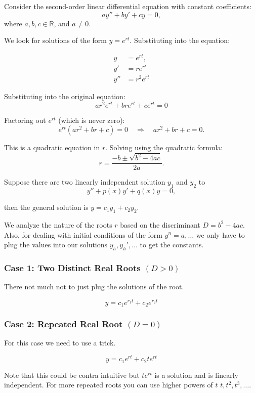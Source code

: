 Consider the second-order linear differential equation with constant coefficients:
\[
a y'' + b y' + c y = 0,
\]
where \( a, b, c \in \mathbb{R} \), and \( a \neq 0 \).

We look for solutions of the form \( y = e^{rt} \). Substituting into the equation:

\begin{align*}
y &= e^{rt}, \\
y' &= r e^{rt} \\
y'' &=  r^2 e^{rt}
\end{align*}


Substituting into the original equation:
\[
ar^2 e^{rt} + bre^{rt} + ce^{rt} = 0
\]

Factoring out \( e^{rt} \) (which is never zero):
\[
e^{rt}(ar^2 + br + c) = 0 \quad \Rightarrow \quad ar^2 + br + c = 0.
\]

This is a quadratic equation in \( r \). Solving using the quadratic formula:
\[
r = \frac{-b \pm \sqrt{b^2 - 4ac}}{2a}.
\]

Suppose there are two linearly independent solution \(y_1\) and \(y_2\) to
\[
y'' + p(x)y' + q(x)y = 0,
\]

then the general solution is \(y = c_1 y_1 + c_2 y_2\).
\vspace{\baselineskip}

We analyze the nature of the roots \( r \) based on the discriminant \( D = b^2 - 4ac \).
Also, for dealing with initial conditions of the form \(y^n = a, \dots\) we only have to 
plug the values into our solutions \(y_h, y_{h}', \dots \) to get the constants.

\subsubsection{Case 1: Two Distinct Real Roots \texorpdfstring{\( (D > 0) \)}{}}

There not much not to just plug the solutions of the root.

\[y = c_1 e^{r_1 t} + c_2 e^{r_2 t}\]

\subsubsection{Case 2: Repeated Real Root \texorpdfstring{\( (D = 0) \)}{}}

For this case we need to use a trick.

\[y = c_1 e^{rt} + c_2 te^{rt}\]

Note that this could be contra intuitive but \(te^{rt}\) is a solution and is linearly independent.
For more repeated roots you can use higher powers of \(t\) \(t, t^2, t^3, \dots\).

